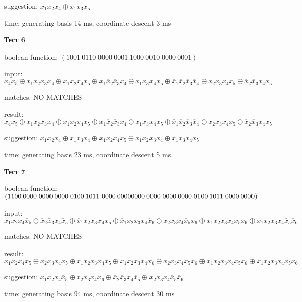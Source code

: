 \documentclass[a4paper,12pt,titlepage,finall]{article}
\begin{document}
suggestion: $x_1 x_2 x_4 \oplus x_1 x_3 x_5$

time: generating basis 14 ms, coordinate descent 3 ms

\textbf{Тест 6}

boolean function: $(1001\:0110\;0000\:0001\;1000\:0010\;0000\:0001)$

input: $x_4 x_5 \oplus x_1 x_2 x_3 x_4 \oplus x_1 x_2 x_4 x_5 \oplus x_1 \overline x_2 \overline x_3 x_4 \oplus x_1 x_3 x_4 x_5 \oplus \overline x_1 \overline x_2 \overline x_3 \overline x_4 \oplus x_2 x_3 x_4 x_5 \oplus \overline x_2 \overline x_3 x_4 x_5$

matches: NO MATCHES

result: $x_4 x_5 \oplus x_1 x_2 x_3 x_4 \oplus x_1 x_2 x_4 x_5 \oplus x_1 \overline x_2 \overline x_3 x_4 \oplus x_1 x_3 x_4 x_5 \oplus \overline x_1 \overline x_2 \overline x_3 \overline x_4 \oplus x_2 x_3 x_4 x_5 \oplus \overline x_2 \overline x_3 x_4 x_5$

suggestion: $x_1 x_2 x_4 \oplus x_1 \overline x_3 x_4 \oplus \overline x_1 x_2 x_4 x_5 \oplus \overline x_1 \overline x_2 \overline x_3 \overline x_4 \oplus \overline x_1 x_3 x_4 x_5$

time: generating basis 23 ms, coordinate descent 5 ms

\textbf{Тест 7}

boolean function: $(1100\:0000\;0000\:0000\;0100\:1011\;0000\:0000\\0000\:0000\;0000\:0000\;0100\:1011\;0000\:0000)$

input: $x_1 x_2 x_4 \overline x_5 \oplus \overline x_2 \overline x_3 x_4 \overline x_5 \oplus \overline x_1 x_2 x_3 x_4 x_5 \oplus \overline x_1 x_2 x_3 x_4 \overline x_6 \oplus x_2 x_3 x_4 \overline x_5 x_6 \oplus x_1 x_2 x_3 x_4 x_5 x_6 \oplus x_1 x_2 x_3 x_4 \overline x_5 \overline x_6$

matches: NO MATCHES

result: $x_1 x_2 x_4 \overline x_5 \oplus \overline x_2 \overline x_3 x_4 \overline x_5 \oplus \overline x_1 x_2 x_3 x_4 x_5 \oplus \overline x_1 x_2 x_3 x_4 \overline x_6 \oplus x_2 x_3 x_4 \overline x_5 x_6 \oplus x_1 x_2 x_3 x_4 x_5 x_6 \oplus x_1 x_2 x_3 x_4 \overline x_5 \overline x_6$

suggestion: $x_1 x_2 x_4 \overline x_5 \oplus x_2 x_3 x_4 x_6 \oplus \overline x_2 \overline x_3 x_4 \overline x_5 \oplus x_2 x_3 x_4 \overline x_5 \overline x_6$

time: generating basis 94 ms, coordinate descent 30 ms
\end{document}
